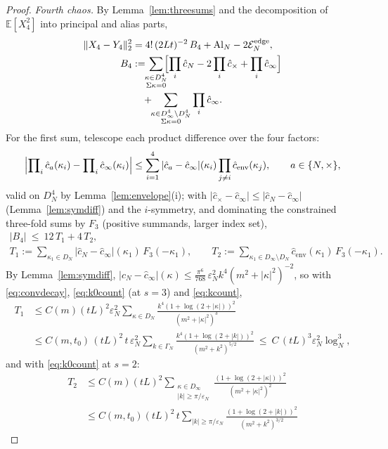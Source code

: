 \documentclass[11pt,a4paper]{article}
\theoremstyle{plain}
\theoremstyle{definition}
\newcommand{\E}{\mathbb{E}}
\newcommand{\eps}{\varepsilon}
\begin{document}
\begin{proof}
\emph{Fourth chaos.} By Lemma~\ref{lem:threesums} and the decomposition of
$\E[X_4^2]$ into principal and alias parts,
\[
 \begin{aligned}
 \|X_4-Y_4\|_2^2
 &=4!\,(2Lt)^{-2}\,B_4+\mathrm{Al}_N-2\mathcal E_N^{\rm edge},\\
 B_4&:=\!\!\sum_{\substack{\kappa\in D_N^4\\ \Sigma\kappa=0}}\!\!
 \Bigl[\prod_i\hat c_N-2\prod_i\hat c_\times+\prod_i\hat c_\infty\Bigr]\\
 &\quad+\!\!\sum_{\substack{\kappa\in D_\infty^4\setminus D_N^4\\
 \Sigma\kappa=0}}\prod_i\hat c_\infty .
 \end{aligned}
\]
For the first sum, telescope each product difference over the four factors:
\[
 \Bigl|\prod\nolimits_i\hat c_a(\kappa_i)-\prod\nolimits_i
 \hat c_\infty(\kappa_i)\Bigr|
 \le\sum_{i=1}^4|\hat c_a-\hat c_\infty|(\kappa_i)
 \prod_{j\ne i}\hat c_{\mathrm{env}}(\kappa_j),
 \qquad a\in\{N,\times\},
\]
valid on $D_N^4$ by Lemma~\ref{lem:envelope}(i); with
$|\hat c_\times-\hat c_\infty|\le|\hat c_N-\hat c_\infty|$
(Lemma~\ref{lem:symdiff}) and the $i$-symmetry, and dominating the
constrained three-fold sums by $F_3$ (positive summands, larger index set),
\begin{gather*}
 |B_4|\ \le\ 12\,T_1+4\,T_2,\\
 T_1:=\sum_{\kappa_1\in D_N}|\hat c_N-\hat c_\infty|(\kappa_1)\,
 F_3(-\kappa_1),\qquad
 T_2:=\sum_{\kappa_1\in D_\infty\setminus D_N}
 \hat c_{\mathrm{env}}(\kappa_1)\,F_3(-\kappa_1).
\end{gather*}
By Lemma~\ref{lem:symdiff}, $|\hat c_N-\hat c_\infty|(\kappa)
\le\frac{\pi^6}{768}\,\eps_N^2k^4(m^2+|\kappa|^2)^{-2}$, so with
\eqref{eq:convdecay}, \eqref{eq:k0count} (at $s=3$) and \eqref{eq:kcount},
\begin{align*}
 T_1&\le C(m)(tL)^2\eps_N^2\sum_{\kappa\in D_N}
 \frac{k^4(1+\log(2+|\kappa|))^2}{(m^2+|\kappa|^2)^3}\\
 &\le C(m,t_0)\,(tL)^2\,t\,\eps_N^2
 \sum_{k\in\Gamma_N}\frac{k^4(1+\log(2+|k|))^2}{(m^2+k^2)^{5/2}}
 \ \le\ C\,(tL)^3\eps_N^2\log_N^3,
\end{align*}
and with \eqref{eq:k0count} at $s=2$:
\begin{align*}
 T_2&\le C(m)(tL)^2\sum_{\substack{\kappa\in D_\infty\\ |k|\ge\pi/\eps_N}}
 \frac{(1+\log(2+|\kappa|))^2}{(m^2+|\kappa|^2)^2}\\
 &\le C(m,t_0)(tL)^2\,t\sum_{|k|\ge\pi/\eps_N}
 \frac{(1+\log(2+|k|))^2}{(m^2+k^2)^{3/2}}

\end{align*}
\end{proof}
\end{document}
